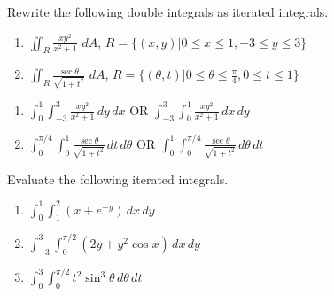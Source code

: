 \begin{Exercise}[title={Applying Fubini's Theorem},label = fubini]
Rewrite the following double integrals as iterated integrals.
\begin{enumerate}
\item $\iint_R \frac{xy^2}{x^2 + 1}\,\,dA$, $R = \{(x,y)|0 \leq x \leq 1, -3 
\leq y \leq 3\}$
\item $\iint_R \frac{\sec{\theta}}{\sqrt{1 + t^2}}\,\,dA$, $R = \{(\theta, t) |
0 \leq \theta \leq \frac{\pi}{4}, 0 \leq t \leq 1 \}$
\end{enumerate}
\vspace{40mm}
\end{Exercise}

\begin{Answer}[ref = fubini]
\begin{enumerate}
\item $\int_0^1 \int_{-3}^3 \frac{xy^2}{x^2 + 1}\,dy\,dx$ OR $\int_{-3}^3 
\int_0^1 \frac{xy^2}{x^2 + 1}\,dx\,dy$
\item $\int_0^{\pi/4} \int_0^1 \frac{\sec{\theta}}{\sqrt{1 + t^2}}\,dt\,
d\theta$ OR $\int_0^1 \int_0^{\pi/4} \frac{\sec{\theta}}{\sqrt{1 + t^2}}\,
d\theta \,dt$
\end{enumerate}
\end{Answer}

\begin{Exercise}[title = {Evaluating Iterated Integrals}, label = iterate_1]
Evaluate the following iterated integrals.
\begin{enumerate}
\item $\int_0^1 \int_1^2 \left( x + e^{-y} \right)\,dx\,dy$
\item $\int_{-3}^3 \int_{0}^{\pi/2} \left( 2y + y^2 \cos{x} \right)\,dx\,dy$
\item $\int_0^3 \int_0^{\pi/2} t^2 \sin^3{\theta}\,d\theta\,dt$
\end{enumerate}
\vspace{100mm}
\end{Exercise}

